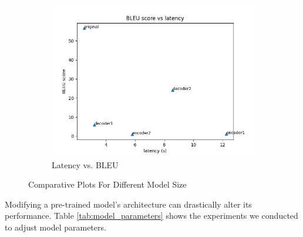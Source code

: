 \documentclass[11pt]{article}
\begin{document}
\begin{figure}[!h]
\begin{subfigure}{0.32\textwidth}
        \includegraphics[width=\textwidth]{images/model/BLEU_vs_latency.png}
        \caption{Latency vs. BLEU }
    \end{subfigure}
    \caption{\label{fig:model_size}Comparative Plots For Different Model Size}  
\end{figure}

Modifying a pre-trained model's architecture can drastically alter its performance. Table \ref{tab:model_parameters} shows the experiments we conducted to adjust model parameters.
\end{document}
